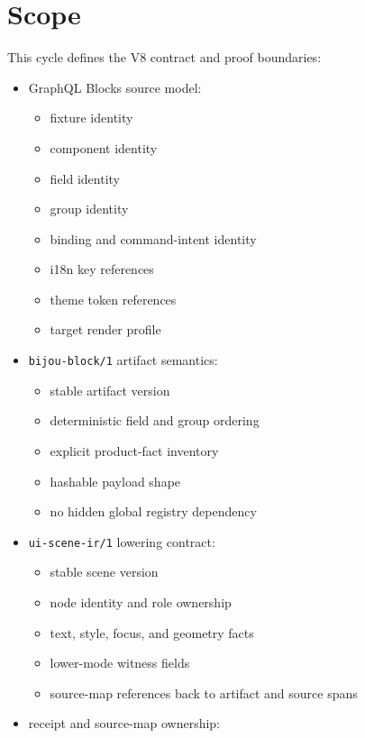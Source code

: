 \section{Scope}\label{record-144-scope}

This cycle defines the V8 contract and proof boundaries:

\begin{itemize}
\tightlist
\item
  GraphQL Blocks source model:

  \begin{itemize}
  \tightlist
  \item
    fixture identity
  \item
    component identity
  \item
    field identity
  \item
    group identity
  \item
    binding and command-intent identity
  \item
    i18n key references
  \item
    theme token references
  \item
    target render profile
  \end{itemize}
\item
  \texttt{b\allowbreak{}i\allowbreak{}j\allowbreak{}o\allowbreak{}u\allowbreak{}-\allowbreak{}b\allowbreak{}l\allowbreak{}o\allowbreak{}c\allowbreak{}k\allowbreak{}/\allowbreak{}1} artifact semantics:

  \begin{itemize}
  \tightlist
  \item
    stable artifact version
  \item
    deterministic field and group ordering
  \item
    explicit product-fact inventory
  \item
    hashable payload shape
  \item
    no hidden global registry dependency
  \end{itemize}
\item
  \texttt{u\allowbreak{}i\allowbreak{}-\allowbreak{}s\allowbreak{}c\allowbreak{}e\allowbreak{}n\allowbreak{}e\allowbreak{}-\allowbreak{}i\allowbreak{}r\allowbreak{}/\allowbreak{}1} lowering contract:

  \begin{itemize}
  \tightlist
  \item
    stable scene version
  \item
    node identity and role ownership
  \item
    text, style, focus, and geometry facts
  \item
    lower-mode witness fields
  \item
    source-map references back to artifact and source spans
  \end{itemize}
\item
  receipt and source-map ownership:


\end{itemize}
